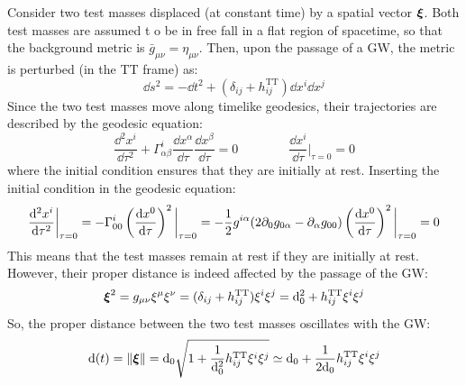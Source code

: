 Consider two test masses displaced (at constant time) by a spatial vector $ \boldsymbol{\xi} $. Both test masses are assumed t
o be in free fall in a flat region of spacetime, so that the background metric is $ \bar{g}_{\mu \nu} = \eta_{\mu \nu} $. Then, upon the passage of a GW, the metric is perturbed (in the TT frame) as:
\begin{equation*}
  \dd s^2 = - \dd t^2 + (\delta_{ij} + h_{ij}^\text{TT}) \dd x^i \dd x^j
\end{equation*}
Since the two test masses move along timelike geodesics, their trajectories are described by the geodesic equation:
\begin{equation*}
  \frac{\dd^2 x^i}{\dd \tau^2} + \Gamma^i_{\alpha \beta} \frac{\dd x^\alpha}{\dd \tau} \frac{\dd x^\beta}{\dd \tau} = 0
  \qquad \qquad
  \frac{\dd x^i}{\dd \tau} \bigg\vert_{\tau = 0} = 0
\end{equation*}
where the initial condition ensures that they are initially at rest. Inserting the initial condition in the geodesic equation:
\begin{equation*}
  \begin{split}
    \frac{\mathrm{d}^2 x^i}{\mathrm{d} \tau^2} \bigg\vert_{\tau = 0} = - \Gamma^i_{00} \left( \frac{\mathrm{d} x^0}{\mathrm{d} \tau} \right)^2 \bigg\vert_{\tau = 0} = - \frac{1}{2} g^{i \alpha} (2 \partial_0 g_{0 \alpha} - \partial_\alpha g_{00}) \left( \frac{\mathrm{d} x^0}{\mathrm{d} \tau} \right)^2 \bigg\vert_{\tau = 0} = 0
  \end{split}
\end{equation*}
This means that the test masses remain at rest if they are initially at rest. However, their proper distance is indeed affected by the passage of the GW:
\begin{equation*}
  \boldsymbol{\xi}^2 = g_{\mu \nu} \xi^\mu \xi^\nu = (\delta_{ij} + h_{ij}^\text{TT}) \xi^i \xi^j = \mathrm{d}_0^2 + h_{ij}^\text{TT} \xi^i \xi^j
\end{equation*}
So, the proper distance between the two test masses oscillates with the GW:
\begin{equation*}
  \mathrm{d}(t) = \left\lVert\boldsymbol{\xi}\right\rVert = \mathrm{d}_0 \sqrt{1 + \frac{1}{\mathrm{d}_0^2} h_{ij}^\text{TT} \xi^i \xi^j} \simeq \mathrm{d}_0 + \frac{1}{2 \mathrm{d}_0} h_{ij}^\text{TT} \xi^i \xi^j
\end{equation*}


